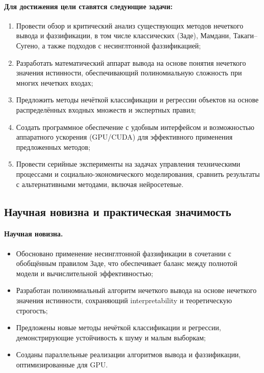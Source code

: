 \paragraph{Для достижения цели ставятся следующие задачи:}
\begin{enumerate}
  \item Провести обзор и критический анализ существующих методов нечеткого вывода и фаззификации, в том числе классических (Заде), Мамдани, Такаги–Сугено, а также подходов с несинглтонной фаззификацией;
  \item Разработать математический аппарат вывода на основе понятия нечеткого значения истинности, обеспечивающий полиномиальную сложность при многих нечетких входах;
  \item Предложить методы нечёткой классификации и регрессии объектов на основе распределённых входных множеств и экспертных правил;
  \item Создать программное обеспечение с удобным интерфейсом и возможностью аппаратного ускорения (GPU/CUDA) для эффективного применения предложенных методов;
  \item Провести серийные эксперименты на задачах управления техническими процессами и социально-экономического моделирования, сравнить результаты с альтернативными методами, включая нейросетевые.
\end{enumerate}

\subsection{Научная новизна и практическая значимость}

\paragraph{Научная новизна.}
\begin{itemize}
  \item Обосновано применение несинглтонной фаззификации в сочетании с обобщённым правилом Заде, что обеспечивает баланс между полнотой модели и вычислительной эффективностью;
  \item Разработан полиномиальный алгоритм нечеткого вывода на основе нечеткого значения истинности, сохраняющий interpretability и теоретическую строгость;
  \item Предложены новые методы нечёткой классификации и регрессии, демонстрирующие устойчивость к шуму и малым выборкам;
  \item Созданы параллельные реализации алгоритмов вывода и фаззификации, оптимизированные для GPU.
\end{itemize}

